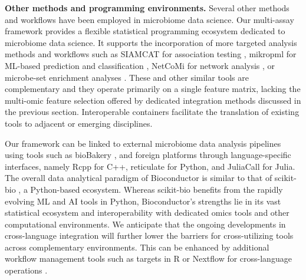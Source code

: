 \documentclass[
  sn-nature,
]{sn-jnl}
\begin{document}
\textbf{Other methods and programming environments.} Several other
methods and workflows have been employed in microbiome data science. Our
multi-assay framework provides a flexible statistical programming
ecosystem dedicated to microbiome data science. It supports the
incorporation of more targeted analysis methods and workflows such as
SIAMCAT for association testing \citep{wirbel2021}, mikropml for
ML-based prediction and classification \citep{topcuoglu2021}, NetCoMi
for network analysis \citep{peschel2021}, or microbe-set enrichment
analyses \citep{kou2020, pham2025}. These and other similar tools are
complementary and they operate primarily on a single feature matrix,
lacking the multi-omic feature selection offered by dedicated
integration methods discussed in the previous section. Interoperable
containers facilitate the translation of existing tools to adjacent or
emerging disciplines.

Our framework can be linked to external microbiome data analysis
pipelines using tools such as bioBakery \citep{beghini2021}, and foreign
platforms through language-specific interfaces, namely Rcpp for C++,
reticulate for Python, and JuliaCall for Julia. The overall data
analytical paradigm of Bioconductor is similar to that of scikit-bio
\citep{aton2026}, a Python-based ecosystem. Whereas scikit-bio benefits
from the rapidly evolving ML and AI tools in Python, Bioconductor's
strengths lie in its vast statistical ecosystem and interoperability
with dedicated omics tools and other computational environments. We
anticipate that the ongoing developments in cross-language integration
will further lower the barriers for cross-utilizing tools across
complementary environments. This can be enhanced by additional workflow
management tools such as targets in R \citep{landau2021} or Nextflow for
cross-language operations \citep{di2017}.
\end{document}
